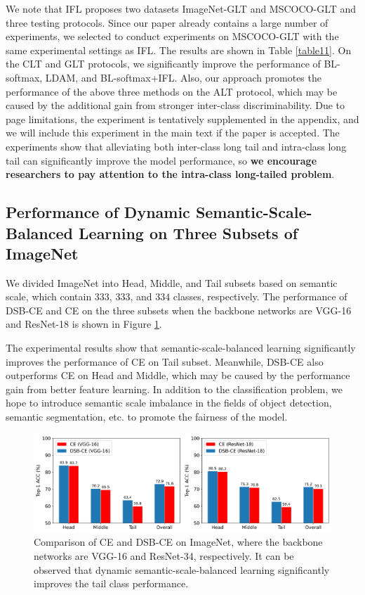\documentclass[10pt]{article} %
\begin{document}
We note that IFL proposes two datasets ImageNet-GLT and MSCOCO-GLT and three testing protocols. Since our paper already contains a large number of experiments, we selected to conduct experiments on MSCOCO-GLT with the same experimental settings as IFL. The results are shown in Table \ref{table11}. On the CLT and GLT protocols, we significantly improve the performance of BL-softmax, LDAM, and BL-softmax+IFL. Also, our approach promotes the performance of the above three methods on the ALT protocol, which may be caused by the additional gain from stronger inter-class discriminability. Due to page limitations, the experiment is tentatively supplemented in the appendix, and we will include this experiment in the main text if the paper is accepted. The experiments show that alleviating both inter-class long tail and intra-class long tail can significantly improve the model performance, so \textbf{we encourage researchers to pay attention to the intra-class long-tailed problem}.
\fi

\subsection{Performance of Dynamic Semantic-Scale-Balanced Learning on Three Subsets of ImageNet\label{H.4}}

We divided ImageNet into Head, Middle, and Tail subsets based on semantic scale, which contain $333$, $333$, and $334$ classes, respectively. The performance of DSB-CE and CE on the three subsets when the backbone networks are VGG-16 and ResNet-18 is shown in Figure \ref{fig23}.

The experimental results show that semantic-scale-balanced learning significantly improves the performance of CE on Tail subset. Meanwhile, DSB-CE also outperforms CE on Head and Middle, which may be caused by the performance gain from better feature learning. In addition to the classification problem, we hope to introduce semantic scale imbalance in the fields of object detection, semantic segmentation, etc. to promote the fairness of the model.

\begin{figure}[h] %
\begin{center}
\includegraphics[width=1\columnwidth]{fig23}
\vskip -0.1in
\caption{Comparison of CE and DSB-CE on ImageNet, where the backbone networks are VGG-16 and ResNet-34, respectively. It can be observed that dynamic semantic-scale-balanced learning significantly improves the tail class performance.}
\label{fig23}
\end{center}
\vskip -0.2in
\end{figure}
\end{document}
